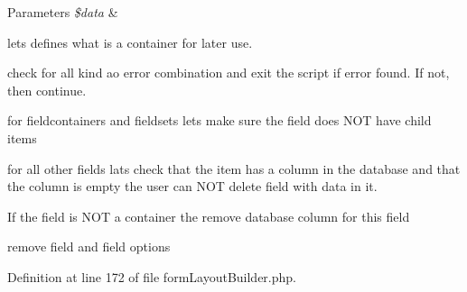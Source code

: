 \begin{DoxyParams}{\-Parameters}
{\em \$data} & \\
\hline
\end{DoxyParams}
lets defines what is a container for later use.

check for all kind ao error combination and exit the script if error found. \-If not, then continue.

for fieldcontainers and fieldsets lets make sure the field does \-N\-O\-T have child items

for all other fields lats check that the item has a column in the database and that the column is empty the user can \-N\-O\-T delete field with data in it.

\-If the field is \-N\-O\-T a container the remove database column for this field

remove field and field options

\-Definition at line 172 of file form\-Layout\-Builder.\-php.


